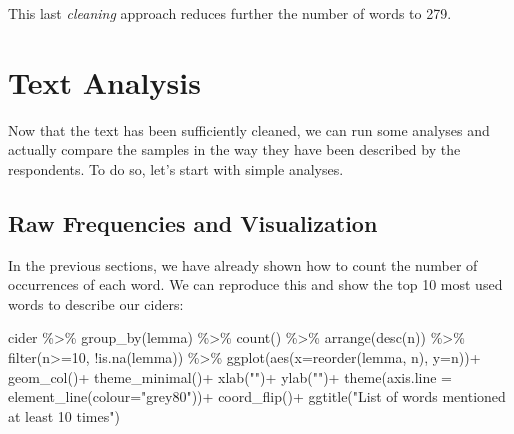 \documentclass[
]{book}
\newenvironment{Shaded}{\begin{snugshade}}{\end{snugshade}}
\newcommand{\AttributeTok}[1]{\textcolor[rgb]{0.77,0.63,0.00}{#1}}
\newcommand{\DecValTok}[1]{\textcolor[rgb]{0.00,0.00,0.81}{#1}}
\newcommand{\FunctionTok}[1]{\textcolor[rgb]{0.00,0.00,0.00}{#1}}
\newcommand{\NormalTok}[1]{#1}
\newcommand{\SpecialCharTok}[1]{\textcolor[rgb]{0.00,0.00,0.00}{#1}}
\newcommand{\StringTok}[1]{\textcolor[rgb]{0.31,0.60,0.02}{#1}}
\begin{document}
This last \emph{cleaning} approach reduces further the number of words to 279.

\hypertarget{text-analysis-1}{%
\section{Text Analysis}\label{text-analysis-1}}

Now that the text has been sufficiently cleaned, we can run some analyses and actually compare the samples in the way they have been described by the respondents. To do so, let's start with simple analyses.

\hypertarget{raw-frequencies-and-visualization}{%
\subsection{Raw Frequencies and Visualization}\label{raw-frequencies-and-visualization}}

In the previous sections, we have already shown how to count the number of occurrences of each word. We can reproduce this and show the top 10 most used words to describe our ciders:

\begin{Shaded}
\begin{Highlighting}[]
\NormalTok{cider }\SpecialCharTok{\%\textgreater{}\%} 
  \FunctionTok{group\_by}\NormalTok{(lemma) }\SpecialCharTok{\%\textgreater{}\%} 
  \FunctionTok{count}\NormalTok{() }\SpecialCharTok{\%\textgreater{}\%} 
  \FunctionTok{arrange}\NormalTok{(}\FunctionTok{desc}\NormalTok{(n)) }\SpecialCharTok{\%\textgreater{}\%} 
  \FunctionTok{filter}\NormalTok{(n}\SpecialCharTok{\textgreater{}=}\DecValTok{10}\NormalTok{, }\SpecialCharTok{!}\FunctionTok{is.na}\NormalTok{(lemma)) }\SpecialCharTok{\%\textgreater{}\%} 
  \FunctionTok{ggplot}\NormalTok{(}\FunctionTok{aes}\NormalTok{(}\AttributeTok{x=}\FunctionTok{reorder}\NormalTok{(lemma, n), }\AttributeTok{y=}\NormalTok{n))}\SpecialCharTok{+}
  \FunctionTok{geom\_col}\NormalTok{()}\SpecialCharTok{+}
  \FunctionTok{theme\_minimal}\NormalTok{()}\SpecialCharTok{+}
  \FunctionTok{xlab}\NormalTok{(}\StringTok{""}\NormalTok{)}\SpecialCharTok{+}
  \FunctionTok{ylab}\NormalTok{(}\StringTok{""}\NormalTok{)}\SpecialCharTok{+}
  \FunctionTok{theme}\NormalTok{(}\AttributeTok{axis.line =} \FunctionTok{element\_line}\NormalTok{(}\AttributeTok{colour=}\StringTok{"grey80"}\NormalTok{))}\SpecialCharTok{+}
  \FunctionTok{coord\_flip}\NormalTok{()}\SpecialCharTok{+}
  \FunctionTok{ggtitle}\NormalTok{(}\StringTok{"List of words mentioned at least 10 times"}\NormalTok{)}
\end{Highlighting}
\end{Shaded}
\end{document}
